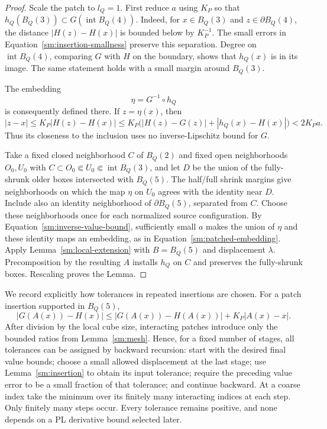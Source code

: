 \begin{proof}
Scale the patch to $l_Q=1$.  First reduce $a$ using $K_P$ so
that $h_Q(B_Q(3))\subset G(\operatorname{int}B_Q(4))$.
Indeed, for $x\in B_Q(3)$ and $z\in\partial B_Q(4)$,
the distance $|H(z)-H(x)|$ is bounded below by $K_P^{-1}$.
The small errors in Equation~\eqref{sm:insertion-smallness} preserve
this separation.  Degree on $\operatorname{int}B_Q(4)$,
comparing $G$ with $H$ on the boundary, shows that $h_Q(x)$
is in its image.  The same statement holds with a small
margin around $B_Q(3)$.

The embedding
\[
 \eta=G^{-1}\circ h_Q
\]
is consequently defined there.  If $z=\eta(x)$, then
\begin{equation}
 \label{sm:inverse-value-bound}
 |z-x|\le K_P|H(z)-H(x)|
 \le K_P\bigl(|H(z)-G(z)|+|h_Q(x)-H(x)|\bigr)
 <2K_Pa.
\end{equation}
Thus its closeness to the inclusion uses no inverse-Lipschitz
bound for $G$.

Take a fixed closed neighborhood $C$ of $B_Q(2)$ and fixed
open neighborhoods $O_0,U_0$ with
$C\subset O_0\Subset U_0\Subset\operatorname{int}B_Q(3)$,
and let $D$ be the union of the fully-shrunk older
boxes intersected with $B_Q(5)$.  The half/full shrink margins
give neighborhoods on which the map $\eta$ on $U_0$ agrees
with the identity near $D$.  Include also an identity
neighborhood of $\partial B_Q(5)$, separated from $C$.
Choose these neighborhoods once for each normalized source
configuration.  By Equation~\eqref{sm:inverse-value-bound}, sufficiently
small $a$ makes the union of $\eta$ and these identity maps
an embedding, as in Equation~\eqref{sm:patched-embedding}.  Apply
Lemma~\ref{sm:local-extension} with $B=B_Q(5)$ and displacement
$\lambda$.  Precomposition by the resulting $A$ installs
$h_Q$ on $C$ and preserves the fully-shrunk boxes.  Rescaling
proves the Lemma.
\end{proof}

We record explicitly how tolerances in repeated insertions are chosen.
For a patch insertion supported in $B_Q(5)$,
\begin{equation}
 \label{sm:value-update}
 |G(A(x))-H(x)|
 \le |G(A(x))-H(A(x))|+K_P|A(x)-x|.
\end{equation}
After division by the local cube size, interacting patches introduce
only the bounded ratios from Lemma~\ref{sm:mesh}.  Hence, for a fixed
number of stages, all tolerances can be assigned by backward
recursion: start with the desired final value bounds; choose a small
allowed displacement at the last stage; use
Lemma~\ref{sm:insertion} to obtain its input tolerance; require the
preceding value error to be a small fraction of that tolerance; and
continue backward.  At a coarse index take the minimum over its
finitely many interacting indices at each step.  Only finitely many
steps occur.  Every tolerance remains positive, and none depends on a
PL derivative bound selected later.

